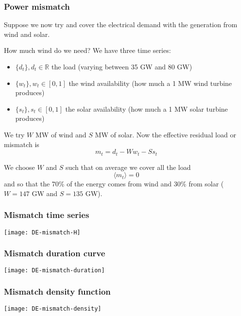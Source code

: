 \documentclass[10pt,aspectratio=169,dvipsnames]{beamer}
\newcommand{\R}{\mathbb{R}}
\let\olditem\item
\renewcommand{\item}{%
\olditem\vspace{5pt}}
\begin{document}
\begin{frame}
  \frametitle{Power mismatch}

  Suppose we now try and cover the electrical demand with the
  generation from wind and solar.

  How much wind do we need? We have three time series:
  \begin{itemize}
  \item $\{ d_t\}, d_t \in \R$ the load (varying between 35 GW and 80 GW)
  \item $\{ w_t\}, w_t \in [0,1]$ the wind availability (how much a 1 MW wind turbine produces)
  \item $\{ s_t\}, s_t \in [0,1]$ the solar availability  (how much a 1 MW solar turbine produces)
  \end{itemize}

  We try $W$ MW of wind and $S$ MW of solar. Now the effective \alert{residual load} or \alert{mismatch} is
  \begin{equation*}
    m_t = d_t - Ww_t - Ss_t
  \end{equation*}

  We choose $W$ and $S$ such that on \alert{average} we cover all the load
  \begin{equation*}
    \langle m_t \rangle = 0
  \end{equation*}
  and so that the 70\% of the energy comes from wind and 30\% from solar ($W = 147$ GW and $S = 135$ GW).

\end{frame}




\begin{frame}
  \frametitle{Mismatch time series}


  \centering
  \texttt{[image: DE-mismatch-H]}

\end{frame}



\begin{frame}
  \frametitle{Mismatch duration curve}



  \centering
  \texttt{[image: DE-mismatch-duration]}

\end{frame}




\begin{frame}
  \frametitle{Mismatch density function}

  \centering
  \texttt{[image: DE-mismatch-density]}

\end{frame}
\end{document}
